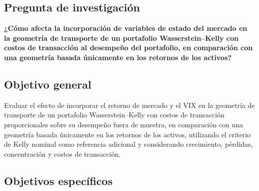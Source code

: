 \documentclass[11pt]{article}
\begin{document}
\subsection{Pregunta de investigación}

\begin{displayquote}
\textbf{¿Cómo afecta la incorporación de variables de estado del mercado en la geometría de transporte de un portafolio Wasserstein–Kelly con costos de transacción al desempeño del portafolio, en comparación con una geometría basada únicamente en los retornos de los activos?}
\end{displayquote}

\subsection{Objetivo general}

Evaluar el efecto de incorporar el retorno de mercado y el VIX en la geometría de transporte de un portafolio Wasserstein–Kelly con costos de transacción proporcionales sobre su desempeño fuera de muestra, en comparación con una geometría basada únicamente en los retornos de los activos, utilizando el criterio de Kelly nominal como referencia adicional y considerando crecimiento, pérdidas, concentración y costos de transacción.

\subsection{Objetivos específicos}
\end{document}
